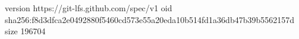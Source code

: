 version https://git-lfs.github.com/spec/v1
oid sha256:f8d3dfca2e0492880f5460cd573e55a20eda10b514fd1a36db47b39b5562157d
size 196704
